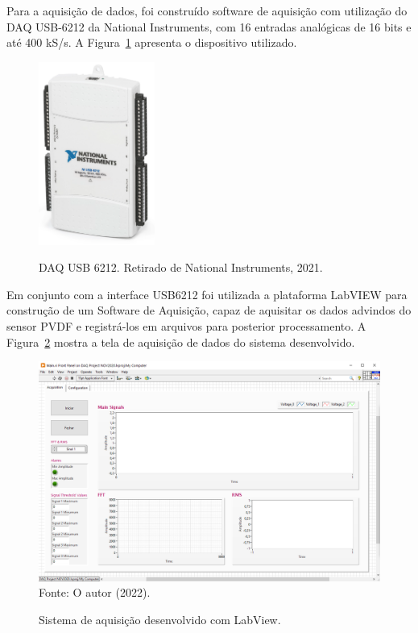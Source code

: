 \documentclass[
	12pt,				
	oneside,			
	a4paper,			
	english,			
	brazil,	
	sumario=abnt-6027-2012		
	]{abntex2ppgsi}
\begin{document}
Para a aquisição de dados, foi construído software de aquisição com utilização do DAQ USB-6212 da National Instruments, com 16 entradas analógicas de 16 bits e até 400 kS/s. A Figura~\ref{USB6212} apresenta o dispositivo utilizado.

\begin{figure}[H]
\centering
\caption {DAQ USB 6212. Retirado de National Instruments, 2021.}
\includegraphics[width=\textwidth,height=60mm,keepaspectratio]{USB6212}
\label{USB6212}
\end{figure}

Em conjunto com a interface USB6212 foi utilizada a plataforma LabVIEW para construção de um Software de Aquisição, capaz de aquisitar os dados advindos do sensor PVDF e registrá-los em arquivos para posterior processamento. A Figura~\ref{sistema_labview} mostra a tela de aquisição de dados do sistema desenvolvido. 

\begin{figure}[H]
\centering
\caption {Sistema de aquisição desenvolvido com LabView.}
\includegraphics[width=\textwidth,height=\textheight,keepaspectratio]{sistema_labview} \\
Fonte: O autor (2022).
\label{sistema_labview}
\end{figure} 
\end{document}
